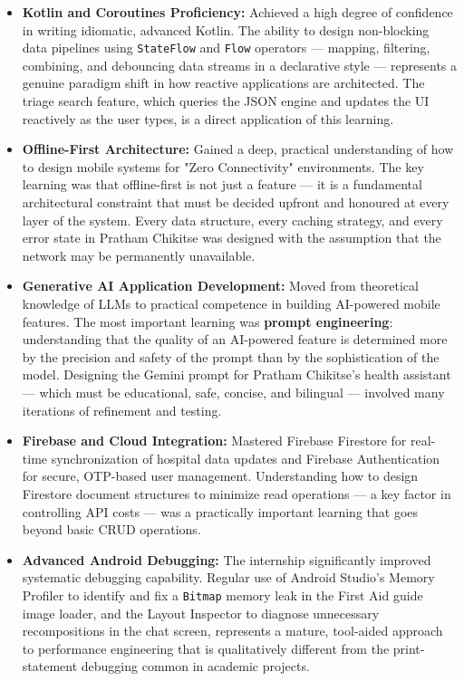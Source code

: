 \documentclass[12pt,a4paper]{report}
\begin{document}
\begin{itemize}
    \item \textbf{Kotlin and Coroutines Proficiency:} Achieved a high degree of confidence in writing idiomatic, advanced Kotlin. The ability to design non-blocking data pipelines using \texttt{StateFlow} and \texttt{Flow} operators — mapping, filtering, combining, and debouncing data streams in a declarative style — represents a genuine paradigm shift in how reactive applications are architected. The triage search feature, which queries the JSON engine and updates the UI reactively as the user types, is a direct application of this learning.

    \item \textbf{Offline-First Architecture:} Gained a deep, practical understanding of how to design mobile systems for "Zero Connectivity" environments. The key learning was that offline-first is not just a feature — it is a fundamental architectural constraint that must be decided upfront and honoured at every layer of the system. Every data structure, every caching strategy, and every error state in Pratham Chikitse was designed with the assumption that the network may be permanently unavailable.

    \item \textbf{Generative AI Application Development:} Moved from theoretical knowledge of LLMs to practical competence in building AI-powered mobile features. The most important learning was \textbf{prompt engineering}: understanding that the quality of an AI-powered feature is determined more by the precision and safety of the prompt than by the sophistication of the model. Designing the Gemini prompt for Pratham Chikitse's health assistant — which must be educational, safe, concise, and bilingual — involved many iterations of refinement and testing.

    \item \textbf{Firebase and Cloud Integration:} Mastered Firebase Firestore for real-time synchronization of hospital data updates and Firebase Authentication for secure, OTP-based user management. Understanding how to design Firestore document structures to minimize read operations — a key factor in controlling API costs — was a practically important learning that goes beyond basic CRUD operations.

    \item \textbf{Advanced Android Debugging:} The internship significantly improved systematic debugging capability. Regular use of Android Studio's Memory Profiler to identify and fix a \texttt{Bitmap} memory leak in the First Aid guide image loader, and the Layout Inspector to diagnose unnecessary recompositions in the chat screen, represents a mature, tool-aided approach to performance engineering that is qualitatively different from the print-statement debugging common in academic projects.
\end{itemize}
\end{document}

